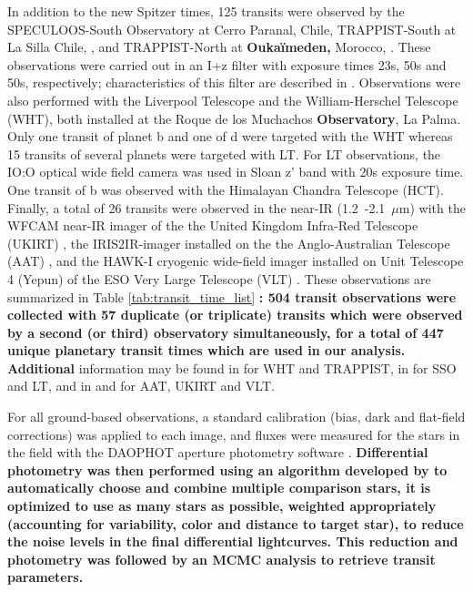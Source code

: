 \documentclass[twocolumn]{aastex63}
\begin{document}
In addition to the new Spitzer times, 125 transits were observed by the SPECULOOS-South Observatory \citetext{SSO, \citealt{Burdanov2018,Jehin2018}, \citealt{Gillon2018}, \citealt{Delrez2018b}} at Cerro Paranal, Chile, TRAPPIST-South at La Silla Chile, \citep[TS;][]{Jehin2011,Gillon2011}, and TRAPPIST-North at \textbf{Ouka\"imeden,} Morocco, \citep[TN;][]{Barkaoui2019AJ}. These observations were carried out in an I+z filter with exposure times 23s, 50s and 50s, respectively; characteristics of this filter are described in \cite{Murray2020}.
Observations were also performed with the Liverpool Telescope  \citep[LT,][]{Steele2004} and the William-Herschel Telescope (WHT), both installed at the Roque de los Muchachos \textbf{Observatory}, La Palma. Only one transit of planet b and one of d were targeted with the WHT whereas 15 transits of several planets were targeted with LT. For LT observations, the IO:O optical wide field camera was used in Sloan z' band with 20s exposure time. One transit of b was observed with the  Himalayan Chandra Telescope (HCT). Finally, a total of 26 transits were observed in the near-IR (1.2~-2.1~$\mu$m) with the WFCAM near-IR imager of the the United Kingdom Infra-Red Telescope (UKIRT) \citep{Casali2007}, the IRIS2IR-imager installed on the the Anglo-Australian Telescope (AAT) \citep{Tinney2004}, and the HAWK-I cryogenic wide-field imager installed on Unit Telescope 4 (Yepun) of the ESO Very Large Telescope (VLT) \citep{Siebenmorgen2011}.
These observations are summarized in Table \ref{tab:transit_time_list} \textbf{: 504 transit observations were collected with 57 duplicate (or triplicate) transits which were observed by a second (or third) observatory simultaneously, for a total of 447 unique planetary transit times which are used in our analysis.  Additional} information may be found in \citet{Gillon2016} for WHT and TRAPPIST, in  \citet{Ducrot2018} for SSO and LT, and in \citet{Gillon2017} and \citet{Burdanov2019} for AAT, UKIRT and VLT.

For all ground-based observations, a standard calibration (bias, dark and flat-field corrections) was applied to each image, and fluxes were measured for the stars in the field with the DAOPHOT aperture photometry software \citep{Stetson1987}. \textbf{Differential photometry was then performed using an algorithm developed by \cite{Murray2020} to automatically choose and combine multiple comparison stars, it is optimized to use as many stars as possible, weighted appropriately (accounting for variability, color and distance to target star), to reduce the noise levels in the final differential lightcurves. This reduction and photometry was followed by an MCMC analysis to retrieve transit parameters.}
\end{document}
